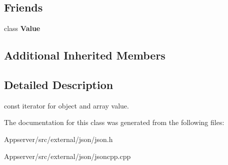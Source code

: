 \subsection*{Friends}
\begin{DoxyCompactItemize}
\item 
class {\bfseries Value}\hypertarget{classJson_1_1ValueConstIterator_aeceedf6e1a7d48a588516ce2b1983d6f}{}\label{classJson_1_1ValueConstIterator_aeceedf6e1a7d48a588516ce2b1983d6f}

\end{DoxyCompactItemize}
\subsection*{Additional Inherited Members}


\subsection{Detailed Description}
const iterator for object and array value. 



The documentation for this class was generated from the following files\+:\begin{DoxyCompactItemize}
\item 
Appserver/src/external/json/json.\+h\item 
Appserver/src/external/json/jsoncpp.\+cpp\end{DoxyCompactItemize}
